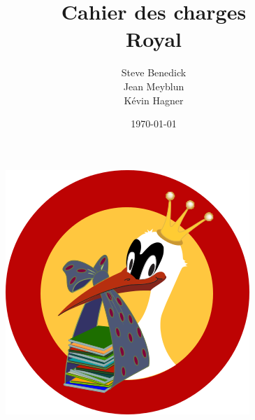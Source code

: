 \documentclass[T3]{rapport-iutrs}
\title{Cahier des charges\\Royal}
\author{Steve Benedick\\Jean Meyblun\\Kévin Hagner}
\date\today
\begin{document}
\maketitle
\begin{figure}[h]
\begin{center}
\includegraphics{../img/logoRoyal.png}
\end{center}
\end{figure}

\newpage{}

\newpage{}

\tableofcontents
\newpage{}


\newpage{}


\newpage{}


\newpage{}


\newpage{}


\end{document}
